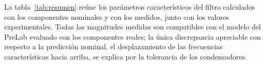 \documentclass[a4paper,11pt]{article}
\begin{document}
La tabla~\ref{tab:resumen} reúne los parámetros característicos del filtro calculados con los componentes nominales y con los medidos, junto con los valores experimentales. Todas las magnitudes medidas son compatibles con el modelo del PreLab evaluado con los componentes reales; la única discrepancia apreciable con respecto a la predicción nominal, el desplazamiento de las frecuencias características hacia arriba, se explica por la tolerancia de los condensadores.
\end{document}
